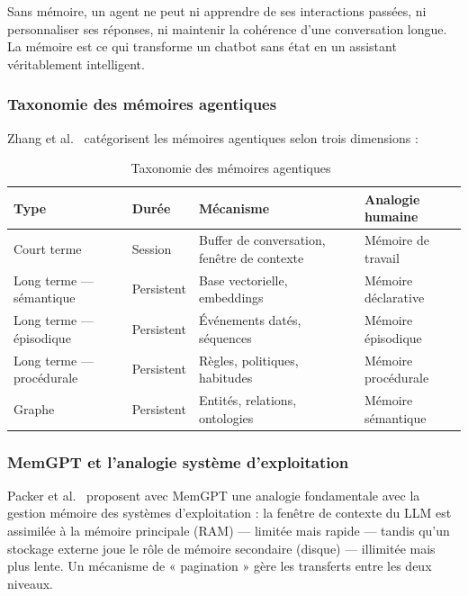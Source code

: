 \documentclass[12pt, a4paper]{article}
\newcommand{\acrshort}[1]{\MakeUppercase{#1}}
\begin{document}
Sans mémoire, un agent ne peut ni apprendre de ses interactions passées, ni personnaliser ses réponses, ni maintenir la cohérence d'une conversation longue. La mémoire est ce qui transforme un chatbot sans état en un assistant véritablement intelligent.

\subsubsection{Taxonomie des mémoires agentiques}

Zhang et al.~\cite{zhang2024survey} catégorisent les mémoires agentiques selon trois dimensions :

\begin{table}[H]
\centering
\caption{Taxonomie des mémoires agentiques~\cite{zhang2024survey}}
\label{tab:memory_taxonomy}
\small
\begin{tabularx}{\textwidth}{l l X l}
\toprule
\textbf{Type} & \textbf{Durée} & \textbf{Mécanisme} & \textbf{Analogie humaine} \\
\midrule
Court terme & Session & Buffer de conversation, fenêtre de contexte & Mémoire de travail \\
Long terme — sémantique & Persistent & Base vectorielle, embeddings & Mémoire déclarative \\
Long terme — épisodique & Persistent & Événements datés, séquences & Mémoire épisodique \\
Long terme — procédurale & Persistent & Règles, politiques, habitudes & Mémoire procédurale \\
Graphe & Persistent & Entités, relations, ontologies & Mémoire sémantique \\
\bottomrule
\end{tabularx}
\end{table}

\subsubsection{MemGPT et l'analogie système d'exploitation}

Packer et al.~\cite{packer2023memgpt} proposent avec MemGPT une analogie fondamentale avec la gestion mémoire des systèmes d'exploitation : la fenêtre de contexte du \acrshort{llm} est assimilée à la mémoire principale (RAM) — limitée mais rapide — tandis qu'un stockage externe joue le rôle de mémoire secondaire (disque) — illimitée mais plus lente. Un mécanisme de « pagination » gère les transferts entre les deux niveaux.
\end{document}
